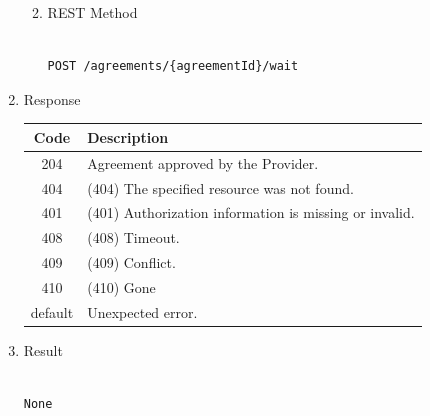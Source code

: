 \begin{enumerate}
\begin{enumerate}
\begin{table}[H]
\begin{center}
\begin{tabular}{|p{3cm}|l|p{3cm}|p{3cm}|p{4cm}|}
\end{tabular}
\end{center}

\end{table}

\item REST Method

\begin{tcolorbox}[boxrule=0pt, frame empty]
\begin{verbatim} 

POST /agreements/{agreementId}/wait

\end{verbatim}
\end{tcolorbox}

\end{enumerate}

\item Response

\begin{table}[H]
\footnotesize

\begin{center}
\begin{tabular}{|c|l|} 
\hline
\rowcolor{lightgray}	Code 		& 	Description \\
\hline
204	 		&	Agreement approved by the Provider. \\
\hline
404			&	(404) The specified resource was not found. \\
\hline
401			&	(401) Authorization information is missing or invalid. \\
\hline
408			&	(408) Timeout. \\
\hline
409			&	(409) Conflict. \\
\hline
410			&	(410) Gone \\
\hline
default		&	Unexpected error. \\
\hline
\end{tabular}
\end{center}

\end{table}

\item Result

\begin{tcolorbox}[boxrule=0pt, frame empty]
\begin{verbatim}

None

\end{verbatim}
\end{tcolorbox}


\end{enumerate}
